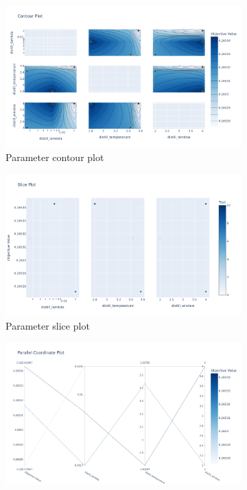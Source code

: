 \begin{figure}[H]
    \centering
    \begin{subfigure}{0.49\linewidth}
        \centering
        \includegraphics[width=\linewidth]{assets/plots/eval/porto/optuna/phase1/contour_plot.pdf}
        \caption{Parameter contour plot}
    \end{subfigure}
    \begin{subfigure}{0.49\linewidth}
        \centering
        \includegraphics[width=\linewidth]{assets/plots/eval/porto/optuna/phase1/slice_plot.pdf}
        \caption{Parameter slice plot}
    \end{subfigure}
    \begin{subfigure}{0.49\linewidth}
        \centering
        \includegraphics[width=\linewidth]{assets/plots/eval/porto/optuna/phase1/parallel_coordinate.pdf}

\end{subfigure}
\end{figure}
